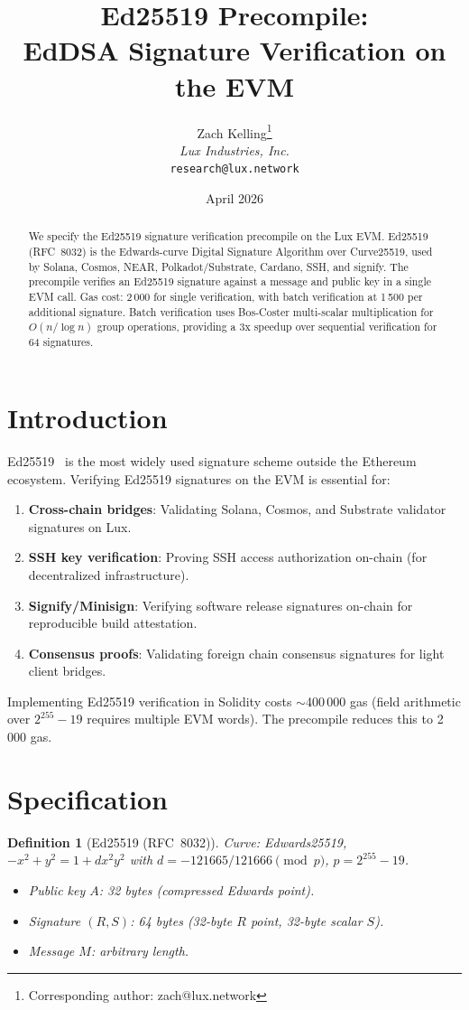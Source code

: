 \documentclass[11pt,a4paper]{article}
\title{Ed25519 Precompile:\\EdDSA Signature Verification on the EVM}
\author{
Zach Kelling\thanks{Corresponding author: zach@lux.network}\\
\textit{Lux Industries, Inc.}\\
\texttt{research@lux.network}
}
\date{April 2026}
\newtheorem{definition}{Definition}
\begin{document}
\luxcoverpage

\begin{abstract}
We specify the Ed25519 signature verification precompile on the Lux EVM. Ed25519
(RFC~8032) is the Edwards-curve Digital Signature Algorithm over Curve25519,
used by Solana, Cosmos, NEAR, Polkadot/Substrate, Cardano, SSH, and signify.
The precompile verifies an Ed25519 signature against a message and public key
in a single EVM call. Gas cost: 2\,000 for single verification, with batch
verification at 1\,500 per additional signature. Batch verification uses
Bos-Coster multi-scalar multiplication for $O(n/\log n)$ group operations,
providing a 3x speedup over sequential verification for 64 signatures.
\end{abstract}

\section{Introduction}

Ed25519~\cite{rfc8032} is the most widely used signature scheme outside the
Ethereum ecosystem. Verifying Ed25519 signatures on the EVM is essential for:
\begin{enumerate}[label=(\roman*)]
  \item \textbf{Cross-chain bridges}: Validating Solana, Cosmos, and Substrate
    validator signatures on Lux.
  \item \textbf{SSH key verification}: Proving SSH access authorization on-chain
    (for decentralized infrastructure).
  \item \textbf{Signify/Minisign}: Verifying software release signatures on-chain
    for reproducible build attestation.
  \item \textbf{Consensus proofs}: Validating foreign chain consensus signatures
    for light client bridges.
\end{enumerate}

Implementing Ed25519 verification in Solidity costs $\sim$400\,000 gas (field
arithmetic over $2^{255}-19$ requires multiple EVM words). The precompile reduces
this to 2\,000 gas.

\section{Specification}

\begin{definition}[Ed25519 (RFC~8032)]
Curve: Edwards25519, $-x^2 + y^2 = 1 + dx^2y^2$ with
$d = -121665/121666 \pmod{p}$, $p = 2^{255} - 19$.
\begin{itemize}
  \item Public key $A$: 32 bytes (compressed Edwards point).
  \item Signature $(R, S)$: 64 bytes (32-byte $R$ point, 32-byte scalar $S$).
  \item Message $M$: arbitrary length.
\end{itemize}
\end{definition}
\end{document}
